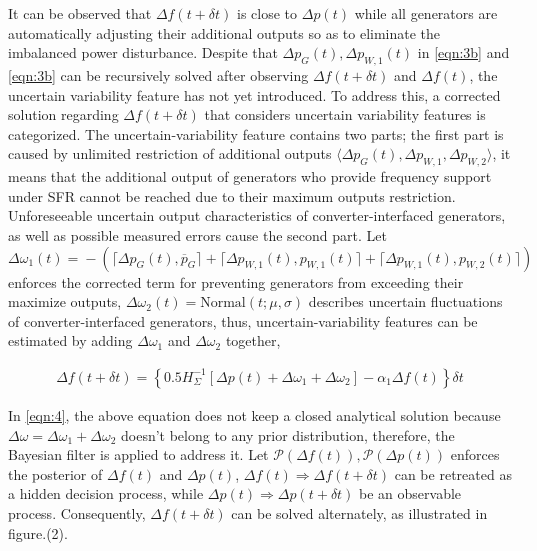 \documentclass[lettersize,journal]{IEEEtran}
\begin{document}
It can be observed that \(\varDelta f(t\!+\!\delta t)\) is close to \(\varDelta p(t)\) while all generators are automatically adjusting their additional outputs so as to eliminate the imbalanced power disturbance.
Despite that \( \varDelta p_{G}(t), \varDelta p_{W,1}(t) \) in \eqref{eqn:3b} and \eqref{eqn:3b} can be recursively solved after observing \(\varDelta f(t\!+\! \delta t)\) and \(\varDelta f(t)\), the uncertain variability feature has not yet introduced. To address this, a corrected solution regarding $\varDelta f (t\!+\!\delta t)$ that considers uncertain variability features is categorized. The uncertain-variability feature contains two parts; the first part is caused by unlimited restriction of additional outputs \(\langle \varDelta p_{G}(t),\varDelta p_{W, 1},\varDelta p_{W,2}\rangle\), it means that the additional output of generators who provide frequency support under SFR cannot be reached due to their maximum outputs restriction. Unforeseeable uncertain output characteristics of converter-interfaced generators, as well as possible measured errors cause the second part.
Let \(\varDelta \omega_{1}(t)\!=\!-\!\left(\lceil \varDelta p_{G}(t), \overline{p}_{G} \rceil \!+\! \lceil \varDelta p_{W,1}(t), {p}_{W,1}(t)\rceil  \!+\! \lceil \varDelta p_{W,1}(t), {p}_{W,2}(t)\rceil\right)  \) enforces the corrected term for preventing generators from exceeding their maximize outputs, \(\varDelta \omega_{2}(t)=\textrm{Normal}(t; \mu, \sigma)\) describes uncertain fluctuations of converter-interfaced
generators, thus, uncertain-variability features can be estimated by adding \(\varDelta \omega_{1}\) and \(\varDelta \omega_{2}\) together,
\vspace{-0.125in}

\begin{newsubequations}\label{eqn:4}
	\begin{align}
		\varDelta f(t\!+\!\delta t) \!=\!  \left\{ 0.5 {H_{\varSigma}^{-1}}[\varDelta p(t) \!+\! \varDelta \omega_1 \!+\!  \varDelta \omega_2 ] \!-\! \alpha_1 \varDelta f(t)\right\} \delta t
		\label{eqn:4a}\end{align}
\end{newsubequations}

In \eqref{eqn:4}, the above equation does not keep a closed analytical solution because \(\varDelta \omega \!=\! \varDelta \omega_1 \!+\! \varDelta \omega_2\) doesn't belong to any prior distribution, therefore, the Bayesian filter is applied to address it. Let \(\mathcal{P} (\varDelta f(t))\!,\! \mathcal{P}(\varDelta p(t))\) enforces the posterior of \(\varDelta f(t)\) and \(\varDelta p(t)\), \(\varDelta f(t) \Rightarrow \varDelta f(t + \delta t)\) can be retreated as a hidden decision process, while \(\varDelta p(t)\Rightarrow \varDelta p(t+\delta t)\) be an observable process. Consequently, \(\varDelta f(t + \delta t)\) can be solved alternately, as illustrated in figure.(2).
\end{document}
